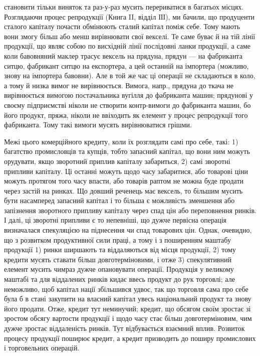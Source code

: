 \parcont{}  %
становити тільки виняток та раз-у-раз мусить перериватися в багатьох
місцях. Розглядаючи процес репродукції (Книга II, відділ ІІІ), ми бачили,
що продуценти сталого капіталу почасти обмінюють сталий капітал поміж
себе. Тому мають вони змогу більш або менш вирівнювати свої векселі. Те саме
буває й на тій лінії продукції, що являє собою по висхідній лінії послідовні ланки
продукції, а саме коли бавовняний маклер трасує вексель на прядуна, прядун —
на фабриканта ситцю, фабрикант ситцю на експортера, а цей останній на імпортера
(можливо, знову на імпортера бавовни). Але в той же час ці операції не складаються
в коло, а тому й низка вимог не вирівнюється. Вимога, напр., прядуна
до ткача не вирівнюється вимогою постачальника вугілля до фабриканта машин;
прядунові у своєму підприємстві ніколи не створити контр-вимоги до фабриканта
машин, бо його продукт, пряжа, ніколи не ввіходить як елемент у процес репродукції
того фабриканта. Тому такі вимоги мусять вирівнюватися грішми.

Межі цього комерційного кредиту, коли їх розглядати самі про себе,
такі: 1) багатство промисловців та купців, тобто запасний капітал, що вони ним
можуть орудувати, якщо зворотний приплив капіталу забариться, 2) самі зворотні
припливи капіталу. Ці останні можуть щодо часу забаритися, або товарові ціни
можуть протягом того часу впасти, або товарів раптом не можна буде продати
через застій на ринках. Що довший реченець має вексель, то більшим мусить
бути насамперед запасний капітал і то більша є можливість зменшення або
запізнення зворотного припливу капіталу через спад цін або переповнення ринків.
І далі, ці зворотні припливи є то непевніші, що дужче первісна операція визначалася
спекуляцією на піднесення чи спад товарових цін. Однак, очевидно, що
з розвитком продуктивної сили праці, а тому і з поширенням маштабу продукції
1) ринки ширшають та віддаляються від місця продукції, 2) тому кредити мусять
ставати більш довготерміновими, і отже 3) спекулятивний елемент мусить чимраз
дужче опановувати операції. Продукція у великому маштабі та для віддалених ринків
кидає ввесь продукт до рук торговлі; але неможливо, щоб капітал нації збільшився
удвоє, так що торговля сама про себе була б в стані закупити на власний
капітал увесь національний продукт та знову його продати. Отже, кредит
тут неминучий; кредит, що обсягом своїм зростає зі зростом обсягу вартости
продукції і щодо часу стає більш довготерміновим, чим дужче зростає віддаленість
ринків. Тут відбувається взаємний вплив. Розвиток процесу продукції
поширює кредит, а кредит призводить до поширу промислових і торговельних
операцій.

